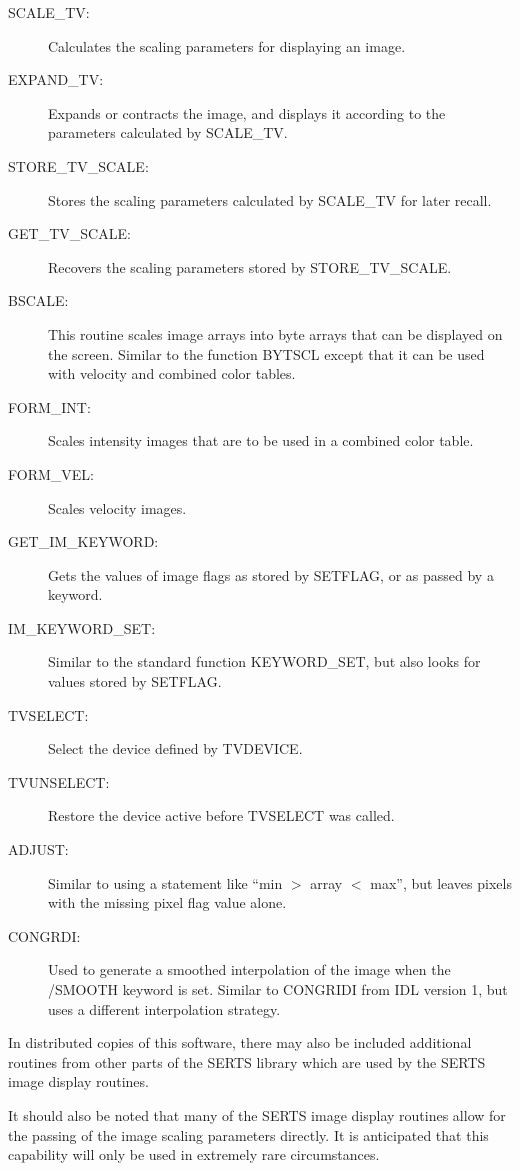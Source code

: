 \begin{description}
\item[SCALE\_TV:]
Calculates the scaling parameters for displaying an image.
\item[EXPAND\_TV:]
Expands or contracts the image, and displays it according to the parameters
calculated by SCALE\_TV.
\item[STORE\_TV\_SCALE:]
Stores the scaling parameters calculated by SCALE\_TV for later recall.
\item[GET\_TV\_SCALE:]
Recovers the scaling parameters stored by STORE\_TV\_SCALE.
\item[BSCALE:]
This routine scales image arrays into byte arrays that can be displayed on the
screen.  Similar to the function BYTSCL except that it can be used with
velocity and combined color tables.
\item[FORM\_INT:]
Scales intensity images that are to be used in a combined color table.
\item[FORM\_VEL:]
Scales velocity images.
\item[GET\_IM\_KEYWORD:]
Gets the values of image flags as stored by SETFLAG, or as passed by a keyword.
\item[IM\_KEYWORD\_SET:]
Similar to the standard function KEYWORD\_SET, but also looks for values stored
by SETFLAG.
\item[TVSELECT:]
Select the device defined by TVDEVICE.
\item[TVUNSELECT:]
Restore the device active before TVSELECT was called.
\item[ADJUST:]
Similar to using a statement like ``min $>$ array $<$ max'', but leaves pixels
with the missing pixel flag value alone.
\item[CONGRDI:]
Used to generate a smoothed interpolation of the image when the /SMOOTH keyword
is set.  Similar to CONGRIDI from IDL version 1, but uses a different
interpolation strategy.
\end{description}

In distributed copies of this software, there may also be included additional
routines from other parts of the SERTS library which are used by the SERTS
image display routines.

It should also be noted that many of the SERTS image display routines allow for
the passing of the image scaling parameters directly.  It is anticipated that
this capability will only be used in extremely rare circumstances.



